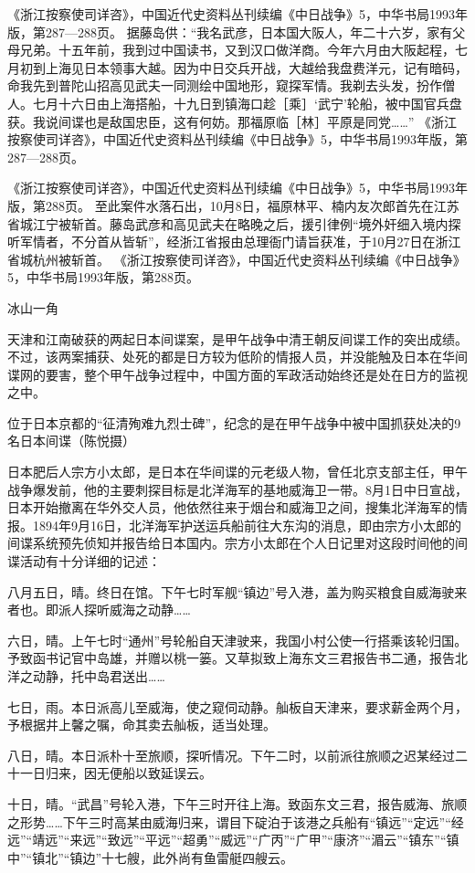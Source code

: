 \documentclass[12pt,UTF8]{ctexbook}
\begin{document}
《浙江按察使司详咨》，中国近代史资料丛刊续编《中日战争》5，中华书局1993年版，第287—288页。
据藤岛供：“我名武彦，日本国大阪人，年二十六岁，家有父母兄弟。十五年前，我到过中国读书，又到汉口做洋商。今年六月由大阪起程，七月初到上海见日本领事大越。因为中日交兵开战，大越给我盘费洋元，记有暗码，命我先到普陀山招高见武夫一同测绘中国地形，窥探军情。我剃去头发，扮作僧人。七月十六日由上海搭船，十九日到镇海口趁［乘］‘武宁’轮船，被中国官兵盘获。我说间谍也是敌国忠臣，这有何妨。那福原临［林］平原是同党……” 《浙江按察使司详咨》，中国近代史资料丛刊续编《中日战争》5，中华书局1993年版，第287—288页。

《浙江按察使司详咨》，中国近代史资料丛刊续编《中日战争》5，中华书局1993年版，第288页。
至此案件水落石出，10月8日，福原林平、楠内友次郎首先在江苏省城江宁被斩首。藤岛武彦和高见武夫在略晚之后，援引律例“境外奸细入境内探听军情者，不分首从皆斩”，经浙江省报由总理衙门请旨获准，于10月27日在浙江省城杭州被斩首。 《浙江按察使司详咨》，中国近代史资料丛刊续编《中日战争》5，中华书局1993年版，第288页。

冰山一角

天津和江南破获的两起日本间谍案，是甲午战争中清王朝反间谍工作的突出成绩。不过，该两案捕获、处死的都是日方较为低阶的情报人员，并没能触及日本在华间谍网的要害，整个甲午战争过程中，中国方面的军政活动始终还是处在日方的监视之中。


位于日本京都的“征清殉难九烈士碑”，纪念的是在甲午战争中被中国抓获处决的9名日本间谍（陈悦摄）

日本肥后人宗方小太郎，是日本在华间谍的元老级人物，曾任北京支部主任，甲午战争爆发前，他的主要刺探目标是北洋海军的基地威海卫一带。8月1日中日宣战，日本开始撤离在华外交人员，他依然往来于烟台和威海卫之间，搜集北洋海军的情报。1894年9月16日，北洋海军护送运兵船前往大东沟的消息，即由宗方小太郎的间谍系统预先侦知并报告给日本国内。宗方小太郎在个人日记里对这段时间他的间谍活动有十分详细的记述：

八月五日，晴。终日在馆。下午七时军舰“镇边”号入港，盖为购买粮食自威海驶来者也。即派人探听威海之动静……

六日，晴。上午七时“通州”号轮船自天津驶来，我国小村公使一行搭乘该轮归国。予致函书记官中岛雄，并赠以桃一篓。又草拟致上海东文三君报告书二通，报告北洋之动静，托中岛君送出……

七日，雨。本日派高儿至威海，使之窥伺动静。舢板自天津来，要求薪金两个月，予根据井上馨之嘱，命其卖去舢板，适当处理。

八日，晴。本日派朴十至旅顺，探听情况。下午二时，以前派往旅顺之迟某经过二十一日归来，因无便船以致延误云。

十日，晴。“武昌”号轮入港，下午三时开往上海。致函东文三君，报告威海、旅顺之形势……下午三时高某由威海归来，谓目下碇泊于该港之兵船有“镇远”“定远”“经远”“靖远”“来远”“致远”“平远”“超勇”“威远”“广丙”“广甲”“康济”“湄云”“镇东”“镇中”“镇北”“镇边”十七艘，此外尚有鱼雷艇四艘云。
\end{document}
